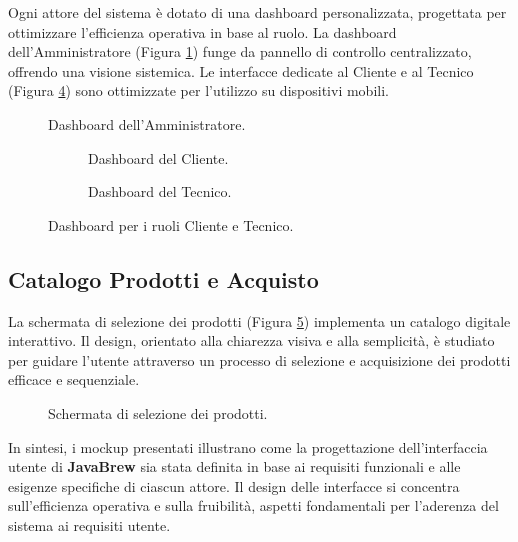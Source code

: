 Ogni attore del sistema è dotato di una dashboard personalizzata, progettata per ottimizzare l'efficienza operativa in base al ruolo. La dashboard dell'Amministratore (Figura \ref{fig:admin}) funge da pannello di controllo centralizzato, offrendo una visione sistemica. Le interfacce dedicate al Cliente e al Tecnico (Figura \ref{fig:customer_worker_dashboards}) sono ottimizzate per l'utilizzo su dispositivi mobili.

\begin{figure}[H]
    \centering
    \caption{Dashboard dell'Amministratore.}
    \label{fig:admin}
\end{figure}

\begin{figure}[H]
    \centering
    \begin{subfigure}[t]{0.48\textwidth}
        \centering
        \caption{Dashboard del Cliente.}
        \label{fig:customer_dash}
    \end{subfigure}
    \hfill
    \begin{subfigure}[t]{0.48\textwidth}
        \centering
        \caption{Dashboard del Tecnico.}
        \label{fig:worker_dash}
    \end{subfigure}
    \caption{Dashboard per i ruoli Cliente e Tecnico.}
    \label{fig:customer_worker_dashboards}
\end{figure}

\subsection{Catalogo Prodotti e Acquisto}

La schermata di selezione dei prodotti (Figura \ref{fig:items}) implementa un catalogo digitale interattivo. Il design, orientato alla chiarezza visiva e alla semplicità, è studiato per guidare l'utente attraverso un processo di selezione e acquisizione dei prodotti efficace e sequenziale.

\begin{figure}[H]
    \centering
    \caption{Schermata di selezione dei prodotti.}
    \label{fig:items}
\end{figure}

\bigskip
In sintesi, i mockup presentati illustrano come la progettazione dell'interfaccia utente di \textbf{JavaBrew} sia stata definita in base ai requisiti funzionali e alle esigenze specifiche di ciascun attore. Il design delle interfacce si concentra sull'efficienza operativa e sulla fruibilità, aspetti fondamentali per l'aderenza del sistema ai requisiti utente.